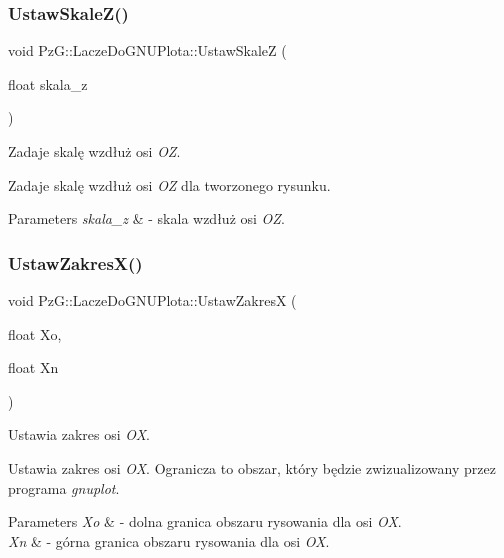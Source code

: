\subsubsection{\texorpdfstring{Ustaw\+Skale\+Z()}{UstawSkaleZ()}}
{\footnotesize\ttfamily void Pz\+G\+::\+Lacze\+Do\+G\+N\+U\+Plota\+::\+Ustaw\+SkaleZ (\begin{DoxyParamCaption}\item[{float}]{skala\+\_\+z }\end{DoxyParamCaption})\hspace{0.3cm}{\ttfamily [inline]}}



Zadaje skalę wzdłuż osi {\itshape OZ}. 

Zadaje skalę wzdłuż osi {\itshape OZ} dla tworzonego rysunku. 
\begin{DoxyParams}{Parameters}
{\em skala\+\_\+z} & -\/ skala wzdłuż osi {\itshape OZ}. \\
\hline
\end{DoxyParams}
\mbox{\label{classPzG_1_1LaczeDoGNUPlota_a9c91987dfc869d6fcea96205c581daef}} 
\subsubsection{\texorpdfstring{Ustaw\+Zakres\+X()}{UstawZakresX()}}
{\footnotesize\ttfamily void Pz\+G\+::\+Lacze\+Do\+G\+N\+U\+Plota\+::\+Ustaw\+ZakresX (\begin{DoxyParamCaption}\item[{float}]{Xo,  }\item[{float}]{Xn }\end{DoxyParamCaption})\hspace{0.3cm}{\ttfamily [inline]}}



Ustawia zakres osi {\itshape OX}. 

Ustawia zakres osi {\itshape OX}. Ogranicza to obszar, który będzie zwizualizowany przez programa {\itshape gnuplot}. 
\begin{DoxyParams}{Parameters}
{\em Xo} & -\/ dolna granica obszaru rysowania dla osi {\itshape OX}. \\
\hline
{\em Xn} & -\/ górna granica obszaru rysowania dla osi {\itshape OX}. \\
\hline
\end{DoxyParams}
\mbox{\label{classPzG_1_1LaczeDoGNUPlota_a54c6e9cf9ab2eae479451fd953c2717c}} 
